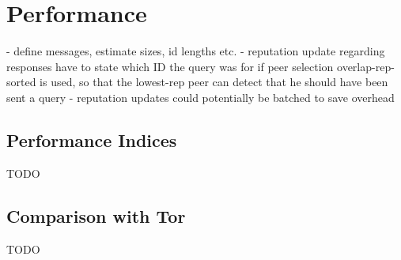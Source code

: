 \chapter{Performance}
- define messages, estimate sizes, id lengths etc.
    - reputation update regarding responses have to state which ID the query was
      for if peer selection overlap-rep-sorted is used, so that the lowest-rep
      peer can detect that he should have been sent a query
- reputation updates could potentially be batched to save overhead
\section{Performance Indices}
TODO
\section{Comparison with Tor}
TODO
